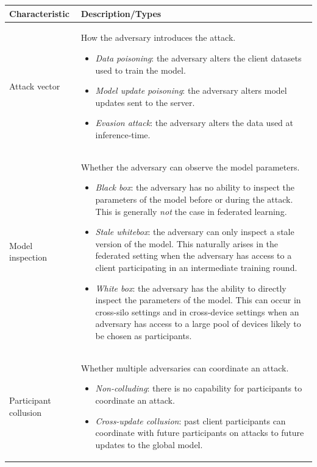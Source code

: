 \documentclass[11pt]{article}
\begin{document}
\begin{table}[h]
\renewcommand{\arraystretch}{1.75}
\begin{center} 
\begin{tabularx}{\textwidth}{lX}
    \toprule
\textbf{Characteristic} & \textbf{Description/Types}\\
\midrule
\addlinespace[0.05in]

Attack vector & How the adversary introduces the attack.
\begin{itemize}[leftmargin=*]
    \setlength\itemsep{0.05em}
    \item\emph{Data poisoning}: the adversary alters the client datasets used to train the model.
    \item\emph{Model update poisoning}: the adversary alters model updates sent to the server.
    \item\emph{Evasion attack}: the adversary alters the data used at inference-time.
\end{itemize}
\\[-.5em]
\raggedright Model inspection & Whether the adversary can observe the model parameters.
\begin{itemize}[leftmargin=*]
    \setlength\itemsep{0.05em}
    \item \emph{Black box}: the adversary has no ability to inspect the parameters of the model before or during the attack. This is generally \emph{not} the case in federated learning.
    \item \emph{Stale whitebox}: the adversary can only inspect a stale version of the model. This naturally arises in the federated setting when the adversary has access to a client participating in an intermediate training round.
    \item \emph{White box}: the adversary has the ability to directly inspect the parameters of the model. This can occur in cross-silo settings and in cross-device settings when an adversary has access to a large pool of devices likely to be chosen as participants.
\end{itemize}
\\[-.5em]
\raggedright Participant collusion & Whether multiple adversaries can coordinate an attack.
\begin{itemize}[leftmargin=*]
    \setlength\itemsep{0.05em}
    \item \emph{Non-colluding}: there is no capability for participants to coordinate an attack.
    \item \emph{Cross-update collusion}: past client participants can coordinate with future participants on attacks to future updates to the global model.

\end{itemize}
\end{tabularx}
\end{center}
\end{table}
\end{document}
